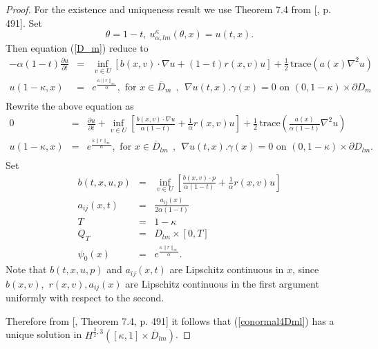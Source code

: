 \documentclass[11pt]{amsart}
\numberwithin{equation}{section}
\begin{document}
\begin{proof} For the existence and uniqueness result we  use  Theorem 7.4 from [\cite{lady},  p. 491]. 
Set
  $$
  \theta=1-t, \ u^{\kappa}_{\alpha,lm}(\theta,x)= u(t,x).
  $$
  Then equation (\ref{D_m}) reduce to
  \begin{eqnarray*}
        \displaystyle{
     -\alpha(1-t)\frac{\partial u}{\partial t} } &=& 
    \displaystyle{ \inf_{v \in U} \left[ b(x,v)\cdot 
    \nabla u + (1-t) r(x,v)u\right]  +\frac{1}{2} \,  \mbox{trace} (a(x)\nabla^2 u) } \\
    \displaystyle{ u(1-\kappa,x) } &=& \displaystyle{ e^{\frac{\kappa \|r\|_{\infty}}{\alpha}}, 
\mbox{ for } x \in \overline{D}_{m} \ \ , \ \ 
    \nabla u(t,x).\gamma(x)=0 \mbox{ on } (0,1-\kappa)\times \partial D_{m} }  \\ 
       \end{eqnarray*}
Rewrite the above equation as
\begin{eqnarray}\label{conormal4Dml}
        \displaystyle{
     0 } &=& 
    \displaystyle{ \frac{\partial u}{\partial t} + \inf_{v \in U} \left[ \frac{ b(x,v)\cdot 
    \nabla u}{\alpha(1-t)} + \frac{1}{\alpha} r(x,v)u\right]  +\frac{1}{2} \, 
    \mbox{trace} \left(\frac{a(x) }{\alpha(1-t)} \nabla^2 u \right) }  \nonumber \\
   \displaystyle{ u(1-\kappa,x) } &=& \displaystyle{ e^{\frac{\kappa \|r\|_{\infty}}{\alpha}}, \mbox{ for } x \in \overline{D}_{lm} \ \ , \ \ 
    \nabla u(t,x).\gamma(x)=0 \mbox{ on } (0,1-\kappa)\times \partial D_{lm} }. \nonumber \\ 
        \end{eqnarray}
 Set
 \begin{eqnarray}
  b(t,x,u,p) &=& \inf_{v\in U} \left[ \frac{b(x,v)\cdot p}{\alpha(1-t)} +\frac{1}{\alpha} r(x,v) u\right] \label{hamiltonian}\\
  a_{ij}(x,t)&=&\frac{a_{ij}(x)}{2\alpha(1-t)} \nonumber \\
 T &=& 1-\kappa \nonumber \\
 Q_T&=& D_{lm} \times [0,T]\nonumber \\
  \psi_0(x)&=& e^{\frac{\kappa \|r\|_{\infty} }{\alpha}} \nonumber.
 \end{eqnarray}
Note that $ b(t,x,u,p)$ and $a_{ij}(x,t)$ are Lipschitz continuous in $x$, since $ b(x,v),$ $ r(x,v), a_{ij}(x)$ are Lipschitz continuous in the first argument uniformly with respect to the second.

 Therefore from [\cite{lady}, Theorem 7.4, p. 491] it follows that (\ref{conormal4Dml}) has a unique solution in $  H^{\frac{3}{2},3}([\kappa,1]\times \overline{D}_{lm})$. 



\end{proof}
\end{document}
